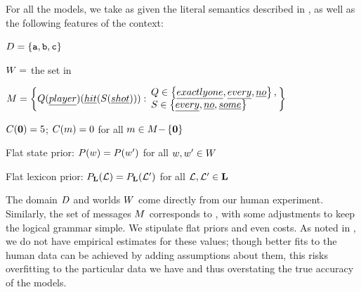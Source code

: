 \documentclass[leqno,12pt]{article}
\begin{document}

For all the models, we take as given the literal semantics described
in , as well as the following features of the
context:
%
\begin{examples}
\item\label{expmod}
  \begin{examples}
  \item $D = \left\{ \texttt{a}, \texttt{b}, \texttt{c} \right\}$
  \item $W = $ the set in 
  \item\label{expformulae} $\Messages =
    \setlength{\arraycolsep}{2pt}
    \set{
      Q(\word{player})(\word{hit}(S(\word{shot}))) :
      \begin{array}{l}        
        Q \in \set{\word{exactly one}, \word{every}, \word{no}}, \\
        S \in \set{\word{every}, \word{no}, \word{some}}
      \end{array}}$
  \item $C(\mathbf{0}) = 5$; $C(m) = 0$ for all $m \in M{-}\left\{ \mathbf{0} \right\}$  
  \item Flat state prior: $P(w) = P(w')$ for all $w, w' \in W$
  \item Flat lexicon prior: $P_{\mathbf{L}}(\mathcal{L}) = P_{\mathbf{L}}(\mathcal{L}')$ for all $\mathcal{L}, \mathcal{L}' \in \mathbf{L}$
  \end{examples}
\end{examples}

The domain $D$ and worlds $W$ come directly from our human
experiment. Similarly, the set of messages $M$ corresponds to
, with some adjustments to keep the logical grammar
simple. We stipulate flat priors and even costs. As noted in
, we do not have empirical estimates for these
values; though better fits to the human data can be achieved by adding
assumptions about them, this risks overfitting to the particular data
we have and thus overstating the true accuracy of the models.
\end{document}
